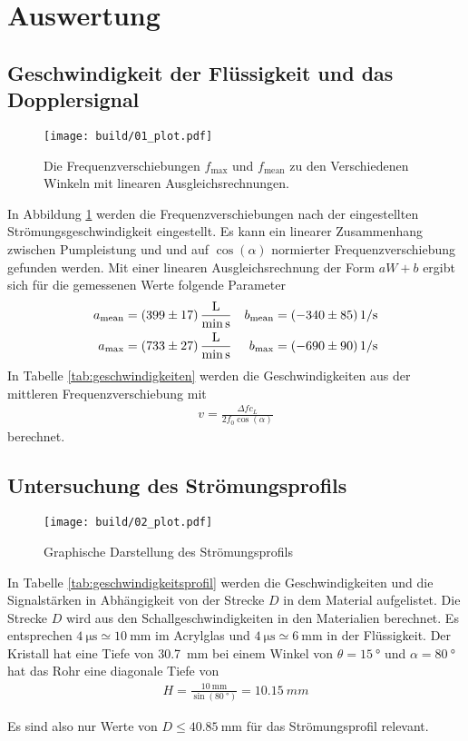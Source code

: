 \section{Auswertung}
\subsection{Geschwindigkeit der Flüssigkeit und das Dopplersignal}
\begin{figure}
    \centering
    \texttt{[image: build/01\_plot.pdf]}
    \caption{Die Frequenzverschiebungen $f_\text{max}$ und $f_\text{mean}$ zu den Verschiedenen Winkeln mit linearen Ausgleichsrechnungen.}
    \label{fig:frequenzen}
\end{figure}


\noindent
In Abbildung \ref{fig:frequenzen} werden die Frequenzverschiebungen nach der eingestellten Strömungsgeschwindigkeit eingestellt.
Es kann ein linearer Zusammenhang zwischen Pumpleistung und und auf $\cos(\alpha)$ normierter Frequenzverschiebung gefunden werden.
Mit einer linearen Ausgleichsrechnung  der Form $a W +b$ ergibt sich für die gemessenen Werte folgende Parameter
\begin{align}
    a_\text{mean} &=  \qty{399  \pm 17}{\liter\per\minute\per\second} &
    b_\text{mean} &=  \qty{-340 \pm 85}{1\per\second}                 \\
    a_\text{max}  &=  \qty{733  \pm 27}{\liter\per\minute\per\second} &
    b_\text{max}  &=  \qty{-690 \pm 90}{1\per\second}                 
\end{align}
In Tabelle \ref{tab:geschwindigkeiten} werden die Geschwindigkeiten aus der mittleren Frequenzverschiebung mit
\begin{align}
    v = \frac{\Delta f  c_L }{2 f_0  \cos(\alpha)}
\end{align}
berechnet.

\subsection{Untersuchung des Strömungsprofils}

\begin{figure}[H]
    \centering
    \texttt{[image: build/02\_plot.pdf]}
    \caption{Graphische Darstellung des Strömungsprofils}
    \label{fig:geschwindigkeitsprofil}
\end{figure}

In Tabelle \ref{tab:geschwindigkeitsprofil} werden die Geschwindigkeiten und die Signalstärken in Abhängigkeit von der
Strecke $D$ in dem Material aufgelistet.
Die Strecke $D$ wird aus den Schallgeschwindigkeiten in den Materialien berechnet.
Es entsprechen $\qty{4}{\micro\s} \simeq \qty{10}{\mm}$ im Acrylglas und $\qty{4}{\micro\s} \simeq \qty{6}{\mm}$ in der Flüssigkeit.
Der Kristall hat eine Tiefe von \qty{30.7}{\mm} bei einem Winkel von $\theta = \qty{15}{\degree}$ und $\alpha = \qty{80}{\degree}$
hat das Rohr eine diagonale Tiefe von
\begin{align}
    H = \frac{\qty{10}{\mm}}{\sin(\qty{80}{\degree})} = \qty{10.15}{mm}
\end{align}

Es sind also nur Werte von $D \leq \qty{40.85}{\mm}$ für das Strömungsprofil relevant.